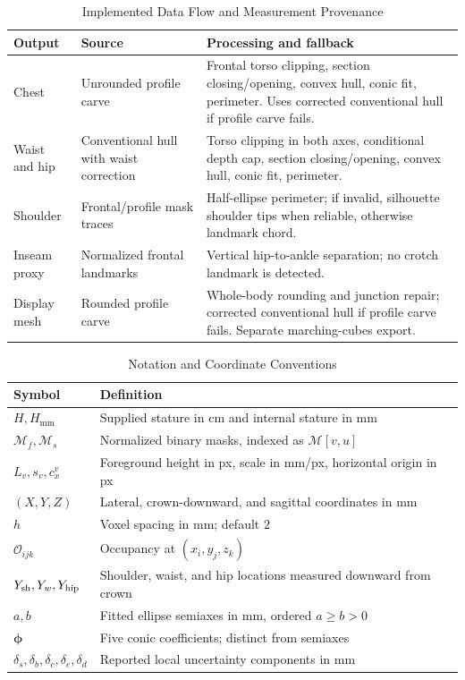 \documentclass[journal]{IEEEtran}
\begin{document}
\begin{table}[!t]
\caption{Implemented Data Flow and Measurement Provenance}
\label{tab:branch_provenance}
\centering\small
\begin{tabular}{p{2.2cm}p{5.7cm}p{7.7cm}}
\toprule
Output & Source & Processing and fallback \\
\midrule
Chest & Unrounded profile carve & Frontal torso clipping, section closing/opening, convex hull, conic fit, perimeter. Uses corrected conventional hull if profile carve fails. \\
Waist and hip & Conventional hull with waist correction & Torso clipping in both axes, conditional depth cap, section closing/opening, convex hull, conic fit, perimeter. \\
Shoulder & Frontal/profile mask traces & Half-ellipse perimeter; if invalid, silhouette shoulder tips when reliable, otherwise landmark chord. \\
Inseam proxy & Normalized frontal landmarks & Vertical hip-to-ankle separation; no crotch landmark is detected. \\
Display mesh & Rounded profile carve & Whole-body rounding and junction repair; corrected conventional hull if profile carve fails. Separate marching-cubes export. \\
\bottomrule
\end{tabular}
\end{table}

\begin{table}[!t]
\caption{Notation and Coordinate Conventions}
\label{tab:notation}
\centering\small
\begin{tabular}{lp{5.7cm}}
\toprule
Symbol & Definition \\
\midrule
$H,H_{\mathrm{mm}}$ & Supplied stature in cm and internal stature in mm \\
$\mathcal M_f,\mathcal M_s$ & Normalized binary masks, indexed as $\mathcal M[v,u]$ \\
$L_v,s_v,c_x^v$ & Foreground height in px, scale in mm/px, horizontal origin in px \\
$(X,Y,Z)$ & Lateral, crown-downward, and sagittal coordinates in mm \\
$h$ & Voxel spacing in mm; default $2$ \\
$\mathcal O_{ijk}$ & Occupancy at $(x_i,y_j,z_k)$ \\
$Y_{\rm sh},Y_w,Y_{\rm hip}$ & Shoulder, waist, and hip locations measured downward from crown \\
$a,b$ & Fitted ellipse semiaxes in mm, ordered $a\ge b>0$ \\
$\boldsymbol\phi$ & Five conic coefficients; distinct from semiaxes \\
$\delta_s,\delta_b,\delta_c,\delta_e,\delta_d$ & Reported local uncertainty components in mm \\
\bottomrule
\end{tabular}
\end{table}
\end{document}
